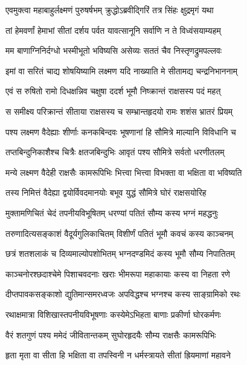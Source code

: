 \twolineshloka
{एवमुक्त्वा महाबाहुर्लक्ष्मणं पुरुषर्षभम्}
{क्रुद्धोऽब्रवीद्गिरिं तत्र सिंहः क्षुद्रमृगं यथा} %

\twolineshloka
{तां हेमवर्णां हेमाभां सीतां दर्शय पर्वत}
{यावत्सानूनि सर्वाणि न ते विध्वंसयाम्यहम्} %

\twolineshloka
{मम बाणाग्निनिर्दग्धो भस्मीभूतो भविष्यसि}
{असेव्यः सततं चैव निस्तृणद्रुमपल्लवः} %

\twolineshloka
{इमां वा सरितं चाद्य शोषयिष्यामि लक्ष्मण}
{यदि नाख्याति मे सीतामद्य चन्द्रनिभाननाम्} %

\twolineshloka
{एवं स रुषितो रामो दिधक्षन्निव चक्षुषा}
{ददर्श भूमौ निष्क्रान्तं राक्षसस्य पदं महत्} %

\twolineshloka
{स समीक्ष्य परिक्रान्तं सीताया राक्षसस्य च}
{सम्भ्रान्तहृदयो रामः शशंस भ्रातरं प्रियम्} %

\twolineshloka
{पश्य लक्ष्मण वैदेह्याः शीर्णाः कनकबिन्दवः}
{भूषणानां हि सौमित्रे माल्यानि विविधानि च} %

\twolineshloka
{तप्तबिन्दुनिकाशैश्च चित्रैः क्षतजबिन्दुभिः}
{आवृतं पश्य सौमित्रे सर्वतो धरणीतलम्} %

\twolineshloka
{मन्ये लक्ष्मण वैदेही राक्षसैः कामरूपिभिः}
{भित्त्वा भित्त्वा विभक्ता वा भक्षिता वा भविष्यति} %

\twolineshloka
{तस्य निमित्तं वैदेह्या द्वयोर्विवदमानयोः}
{बभूव युद्धं सौमित्रे घोरं राक्षसयोरिह} %

\twolineshloka
{मुक्तामणिचितं चेदं तपनीयविभूषितम्}
{धरण्यां पतितं सौम्य कस्य भग्नं महद्धनुः} %

\twolineshloka
{तरुणादित्यसङ्काशं वैदूर्यगुलिकाचितम्}
{विशीर्णं पतितं भूमौ कवचं कस्य काञ्चनम्} %

\twolineshloka
{छत्रं शतशलाकं च दिव्यमाल्योपशोभितम्}
{भग्नदण्डमिदं कस्य भूमौ सौम्य निपातितम्} %

\twolineshloka
{काञ्चनोरश्छदाश्चेमे पिशाचवदनाः खराः}
{भीमरूपा महाकायाः कस्य वा निहता रणे} %

\twolineshloka
{दीप्तपावकसङ्काशो द्युतिमान्समरध्वजः}
{अपविद्धश्च भग्नश्च कस्य साङ्ग्रामिको रथः} %

\twolineshloka
{रथाक्षमात्रा विशिखास्तपनीयविभूषणाः}
{कस्येमेऽभिहता बाणाः प्रकीर्णा घोरकर्मणः} %

\twolineshloka
{वैरं शतगुणं पश्य ममेदं जीवितान्तकम्}
{सुघोरहृदयैः सौम्य राक्षसैः कामरूपिभिः} %

\twolineshloka
{हृता मृता वा सीता हि भक्षिता वा तपस्विनी}
{न धर्मस्त्रायते सीतां ह्रियमाणां महावने} %

